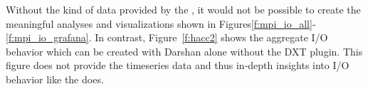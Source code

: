 Without the kind of data provided by the \connector{}, it would not be possible 
to create the meaningful analyses and visualizations shown in 
Figures\ref{f:mpi_io_all}-\ref{f:mpi_io_grafana}. In contrast, 
Figure~\ref{f:hacc2} shows the aggregate I/O behavior which can be created 
with Darshan alone without the DXT plugin. This figure does not provide the 
timeseries data and thus in-depth insights into I/O behavior like the \Darshan{} does.


